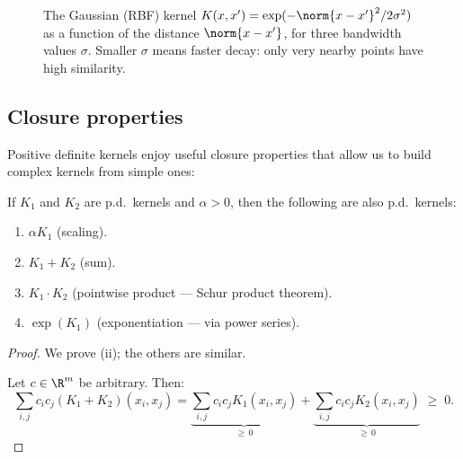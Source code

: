 \begin{notechapter}
\begin{figure}[ht]
\centering
{}
\caption{The Gaussian (RBF) kernel $K(x,x') =
\exp(-\norm{x-x'}^2/2\sigma^2)$ as a function of the distance
$\norm{x-x'}$, for three bandwidth values $\sigma$. Smaller $\sigma$
means faster decay: only very nearby points have high similarity.}
\label{rkhs:fig:rbf_kernel}
\end{figure}

\subsection{Closure properties}
\label{rkhs:subsec:closure}

Positive definite kernels enjoy useful closure properties that allow us
to build complex kernels from simple ones:

\begin{proposition}
\label{rkhs:prop:closure}
If $K_1$ and $K_2$ are p.d.\ kernels and $\alpha > 0$, then the
following are also p.d.\ kernels:
\begin{enumerate}[label=(\roman*)]
  \item $\alpha K_1$ \quad (scaling).
  \item $K_1 + K_2$ \quad (sum).
  \item $K_1 \cdot K_2$ \quad (pointwise product --- Schur product theorem).
  \item $\exp(K_1)$ \quad (exponentiation --- via power series).
\end{enumerate}
\end{proposition}

\begin{proof}
We prove (ii); the others are similar.

Let $c \in \R^m$ be arbitrary. Then:
\[
\sum_{i,j} c_i c_j (K_1 + K_2)(x_i, x_j) = \underbrace{\sum_{i,j} c_i
c_j K_1(x_i, x_j)}_{\geq\, 0} + \underbrace{\sum_{i,j} c_i c_j K_2(x_i,
x_j)}_{\geq\, 0} \;\geq\; 0.
\]
\end{proof}


\end{notechapter}
